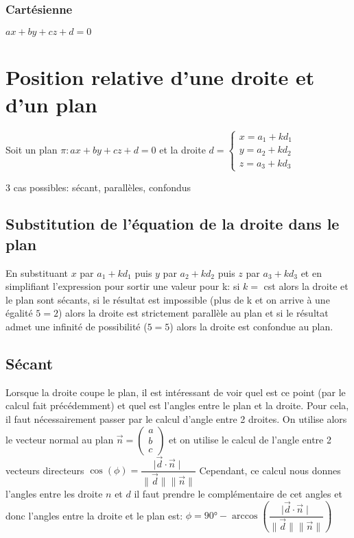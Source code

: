 \documentclass[12pt,a4paper]{report}
\begin{document}
	\subsubsection*{Cartésienne}
	$ ax+by+cz+d=0 $
	\pagebreak
	\section*{Position relative d'une droite et d'un plan}
	Soit un plan $\pi:ax+by+cz+d=0$ et la droite $d=\left\{
	\begin{array}{l}
		x=a_1 + kd_1 \\
		y=a_2 + kd_2 \\
		z=a_3 + kd_3
	\end{array}
	\right.$
	
	3 cas possibles: sécant, parallèles, confondus
	
	\subsection*{Substitution de l'équation de la droite dans le plan}
	En substituant $x$ par $ a_1 + kd_1 $ puis $y$ par $a_2 +  kd_2$ puis $z$ par $a_3 + kd_3$
	et en simplifiant l'expression pour sortir une valeur pour k: si $k=$ cst alors la droite et le plan sont sécants, si le résultat est impossible (plus de k et on arrive à une égalité $5=2$) alors la droite est strictement parallèle au plan et si le résultat admet une infinité de possibilité ($5=5$) alors la droite est confondue au plan.
	
	\subsection*{Sécant}
	Lorsque la droite coupe le plan, il est intéressant de voir quel est ce point (par le calcul fait précédemment) et quel est l'angles entre le plan et la droite.
	Pour cela, il faut nécessairement passer par le calcul d'angle entre 2 droites. On utilise alors le vecteur normal au plan $\overrightarrow{n}=
	\left( \begin{array}{c}
		a \\
		b \\
		c
	\end{array} \right)$
	et on utilise le calcul de l'angle entre 2 vecteurs directeurs $\cos(\phi)= \dfrac{\mid \overrightarrow{d} \cdot \overrightarrow{n} \mid}{\|\overrightarrow{d}\|\|\overrightarrow{n}\|}$
	Cependant, ce calcul nous donnes l'angles entre les droite $n$ et $d$ il faut prendre le complémentaire de cet angles et donc l'angles entre la droite et le plan est: $\phi= 90°- \arccos \left(\dfrac{\mid \overrightarrow{d} \cdot \overrightarrow{n} \mid}{\|\overrightarrow{d}\|\|\overrightarrow{n}\|}\right)$
	
\end{document}
